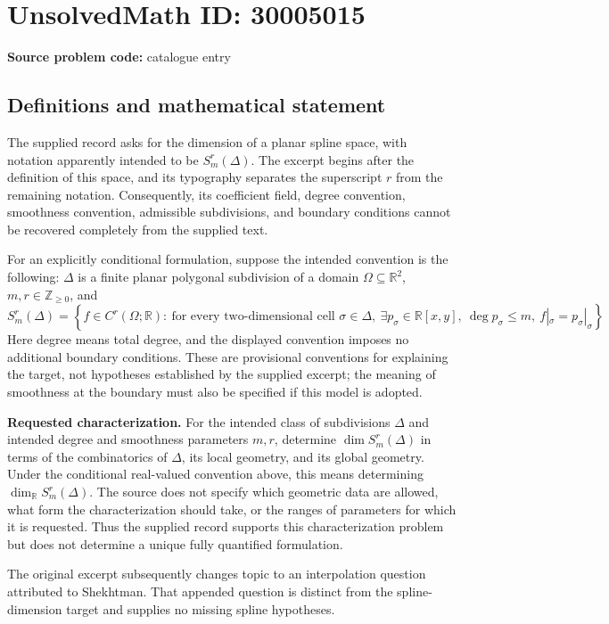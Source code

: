 \documentclass[11pt]{article}
\newcommand{\Z}{\mathbb{Z}}
\newcommand{\R}{\mathbb{R}}
\begin{document}
\section*{UnsolvedMath ID: 30005015}
\textbf{Source problem code:} catalogue entry
\subsection{Definitions and mathematical statement}
The supplied record asks for the dimension of a planar spline space, with notation apparently intended to be \(S_m^r(\Delta)\). The excerpt begins after the definition of this space, and its typography separates the superscript \(r\) from the remaining notation. Consequently, its coefficient field, degree convention, smoothness convention, admissible subdivisions, and boundary conditions cannot be recovered completely from the supplied text.

For an explicitly conditional formulation, suppose the intended convention is the following: \(\Delta\) is a finite planar polygonal subdivision of a domain \(\Omega\subseteq\R^2\), \(m,r\in\Z_{\geq 0}\), and
\[
 S_m^r(\Delta)=\left\{f\in C^r(\Omega;\R):\ \text{for every two-dimensional cell }\sigma\in\Delta,\ \exists p_\sigma\in\R[x,y],\ \deg p_\sigma\leq m,\ f|_\sigma=p_\sigma|_\sigma\right\}.
\]
Here degree means total degree, and the displayed convention imposes no additional boundary conditions. These are provisional conventions for explaining the target, not hypotheses established by the supplied excerpt; the meaning of smoothness at the boundary must also be specified if this model is adopted.

\textbf{Requested characterization.} For the intended class of subdivisions \(\Delta\) and intended degree and smoothness parameters \(m,r\), determine \(\dim S_m^r(\Delta)\) in terms of the combinatorics of \(\Delta\), its local geometry, and its global geometry. Under the conditional real-valued convention above, this means determining \(\dim_{\R}S_m^r(\Delta)\). The source does not specify which geometric data are allowed, what form the characterization should take, or the ranges of parameters for which it is requested. Thus the supplied record supports this characterization problem but does not determine a unique fully quantified formulation.

The original excerpt subsequently changes topic to an interpolation question attributed to Shekhtman. That appended question is distinct from the spline-dimension target and supplies no missing spline hypotheses.
\end{document}
